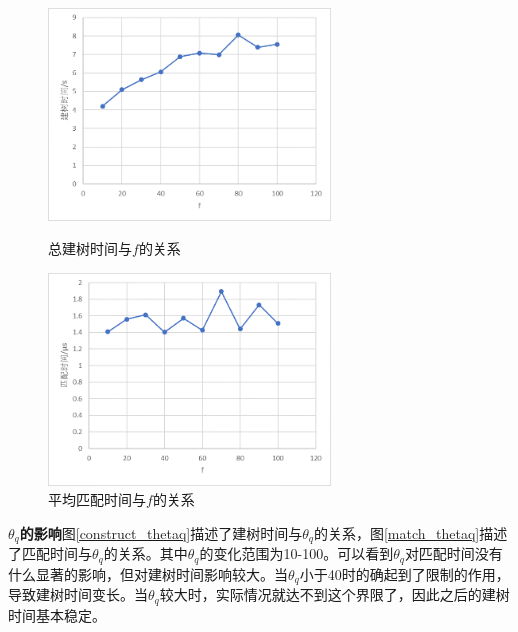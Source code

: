 \documentclass[UTF8]{ctexart}
\begin{document}
\begin{figure}[htbp]
    \centering
    \begin{minipage}[t]{8cm}
        \centering
        \includegraphics[width=7.5cm]{construct_f.png}
        \caption{总建树时间与$f$的关系}
        \label{construct_f}
    \end{minipage}
    \begin{minipage}[t]{8cm}
        \centering
        \includegraphics[width=7.5cm]{match_f.png}
        \caption{平均匹配时间与$f$的关系}
        \label{match_f}
    \end{minipage}
\end{figure}

\textbf{$\theta_q$的影响}\quad 图\ref{construct_thetaq}描述了建树时间与$\theta_q$的关系，图\ref{match_thetaq}描述了匹配时间与$\theta_q$的关系。其中$\theta_q$的变化范围为10-100。可以看到$\theta_q$对匹配时间没有什么显著的影响，但对建树时间影响较大。当$\theta_q$小于40时的确起到了限制的作用，导致建树时间变长。当$\theta_q$较大时，实际情况就达不到这个界限了，因此之后的建树时间基本稳定。
\end{document}
